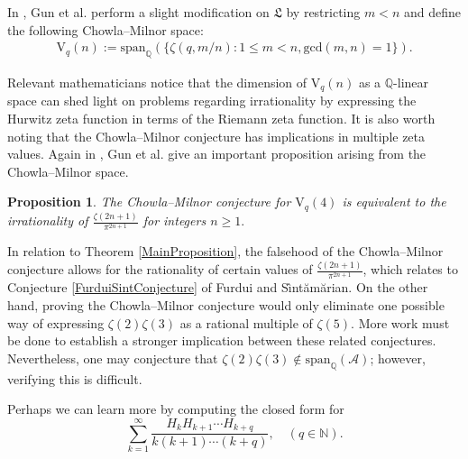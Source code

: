 \documentclass[10pt]{amsart}
\newtheorem{proposition}{Proposition}
\theoremstyle{definition}
\begin{document}
In \cite{ChowlaMilnor}, Gun et al. perform a slight modification on $\mathfrak{L}$ by restricting $m<n$ and define the following Chowla--Milnor space:
\begin{align*}
    \mathrm{V}_q(n):=\mathrm{span}_\mathbb{Q}(\{\zeta(q,m/n):1\leq m<n,\text{gcd}(m,n)=1\}).
\end{align*}

Relevant mathematicians notice that the dimension of $\mathrm{V}_q(n)$ as a $\mathbb{Q}$-linear space can shed light on problems regarding irrationality by expressing the Hurwitz zeta function in terms of the Riemann zeta function. It is also worth noting that the Chowla--Milnor conjecture has implications in multiple zeta values. Again in \cite{ChowlaMilnor}, Gun et al. give an important proposition arising from the Chowla--Milnor space.
\begin{proposition}\label{GunProposition}
    The Chowla--Milnor conjecture for $\mathrm{V}_q(4)$ is equivalent to the irrationality of $\frac{\zeta(2n+1)}{\pi^{2n+1}}$ for integers $n\geq 1.$
\end{proposition}
In relation to Theorem \ref{MainProposition}, the falsehood of the Chowla--Milnor conjecture allows for the rationality of certain values of $\frac{\zeta(2n+1)}{\pi^{2n+1}}$, which relates to Conjecture \ref{FurduiSintConjecture} of Furdui and S{\^\i}nt{\u{a}}m{\u{a}}rian. On the other hand, proving the Chowla--Milnor conjecture would only eliminate one possible way of expressing $\zeta(2)\zeta(3)$ as a rational multiple of $\zeta(5)$. More work must be done to establish a stronger implication between these related conjectures. Nevertheless, one may conjecture that $\zeta(2)\zeta(3) \not\in \mathrm{span}_\mathbb{Q} (\mathcal{A})$; however, verifying this is difficult.

Perhaps we can learn more by computing the closed form for
$$\sum_{k=1}^\infty \frac{H_k H_{k+1}\cdots H_{k+q}}{k(k+1)\cdots (k+q)}, \quad (q \in \mathbb{N}).$$



\end{document}

